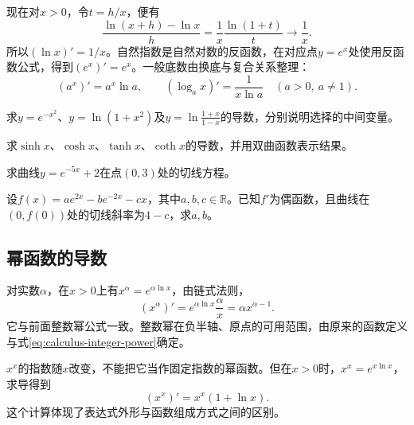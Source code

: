 现在对\(x>0\)，令\(t=h/x\)，便有
\begin{equation*}
 \frac{\ln(x+h)-\ln x}h
 =\frac1x\frac{\ln(1+t)}t\longrightarrow\frac1x.
\end{equation*}
所以\((\ln x)'=1/x\)。自然指数是自然对数的反函数，在对应点\(y=e^x\)处使用反函数公式，得到\((e^x)'=e^x\)。一般底数由换底与复合关系整理：
\begin{equation}\label{eq:calculus-exponential-logarithmic}
 (a^x)'=a^x\ln a,\qquad
 (\log_a x)'=\frac1{x\ln a}\quad(a>0,\ a\ne1).
\end{equation}

\begin{example}
求\(y=e^{-x^2}\)、\(y=\ln(1+x^2)\)及\(y=\ln\frac{1+x}{1-x}\)的导数，分别说明选择的中间变量。
\end{example}

\begin{example}
求\(\sinh x\)、\(\cosh x\)、\(\tanh x\)、\(\coth x\)的导数，并用双曲函数表示结果。
\end{example}

\begin{example}[2014年广东卷理科第10题]
求曲线\(y=e^{-5x}+2\)在点\((0,3)\)处的切线方程。
\end{example}

\begin{example}[2014年重庆卷理科第20题第（1）问]
\label{ex:calculus-chongqing-even-derivative}
设\(f(x)=ae^{2x}-be^{-2x}-cx\)，其中\(a,b,c\in\mathbb R\)。已知\(f'\)为偶函数，且曲线在\((0,f(0))\)处的切线斜率为\(4-c\)，求\(a,b\)。
\end{example}

\subsection{幂函数的导数}

对实数\(\alpha\)，在\(x>0\)上有\(x^\alpha=e^{\alpha\ln x}\)，由链式法则，
\begin{equation*}
 (x^\alpha)'=e^{\alpha\ln x}\frac\alpha x=\alpha x^{\alpha-1}.
\end{equation*}
它与前面整数幂公式一致。整数幂在负半轴、原点的可用范围，由原来的函数定义与式\eqref{eq:calculus-integer-power}确定。

\(x^x\)的指数随\(x\)改变，不能把它当作固定指数的幂函数。但在\(x>0\)时，\(x^x=e^{x\ln x}\)，求导得到
\begin{equation*}
 (x^x)'=x^x(1+\ln x).
\end{equation*}
这个计算体现了表达式外形与函数组成方式之间的区别。

